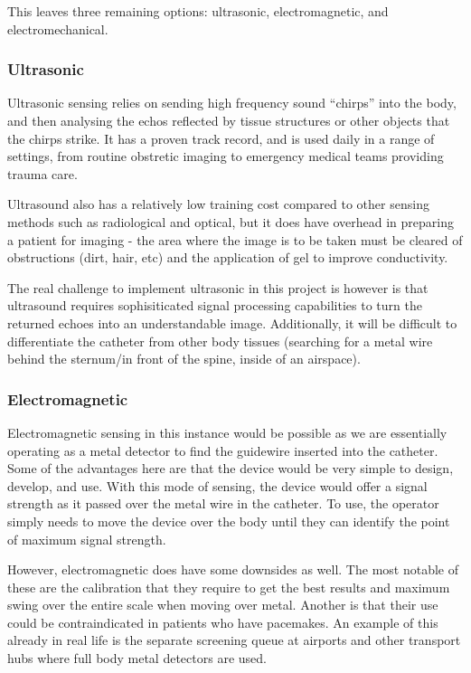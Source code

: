 \documentclass[a4paper]{article}
\begin{document}
        This leaves three remaining options: ultrasonic, electromagnetic, and electromechanical.

            \subsubsection{Ultrasonic}
            Ultrasonic sensing relies on sending high frequency sound ``chirps'' into the body, and then analysing the echos reflected by tissue structures or other objects that the chirps strike. It has a proven track record, and is used daily in a range of settings, from routine obstretic imaging to emergency medical teams providing trauma care.

            Ultrasound also has a relatively low training cost compared to other sensing methods such as radiological and optical, but it does have overhead in preparing a patient for imaging - the area where the image is to be taken must be cleared of obstructions (dirt, hair, etc) and the application of gel to improve conductivity.

            The real challenge to implement ultrasonic in this project is however is that ultrasound requires sophisiticated signal processing capabilities to turn the returned echoes into an understandable image. Additionally, it will be difficult to differentiate the catheter from other body tissues (searching for a metal wire behind the sternum\slash in front of the spine, inside of an airspace).

            \subsubsection{Electromagnetic}
            Electromagnetic sensing in this instance would be possible as we are essentially operating as a metal detector to find the guidewire inserted into the catheter. Some of the advantages here are that the device would be very simple to design, develop, and use. With this mode of sensing, the device would offer a signal strength as it passed over the metal wire in the catheter. To use, the operator simply needs to move the device over the body until they can identify the point of maximum signal strength.

            However, electromagnetic does have some downsides as well. The most notable of these are the calibration that they require to get the best results and maximum swing over the entire scale when moving over metal. Another is that their use could be contraindicated in patients who have pacemakes. An example of this already in real life is the separate screening queue at airports and other transport hubs where full body metal detectors are used.
\end{document}
